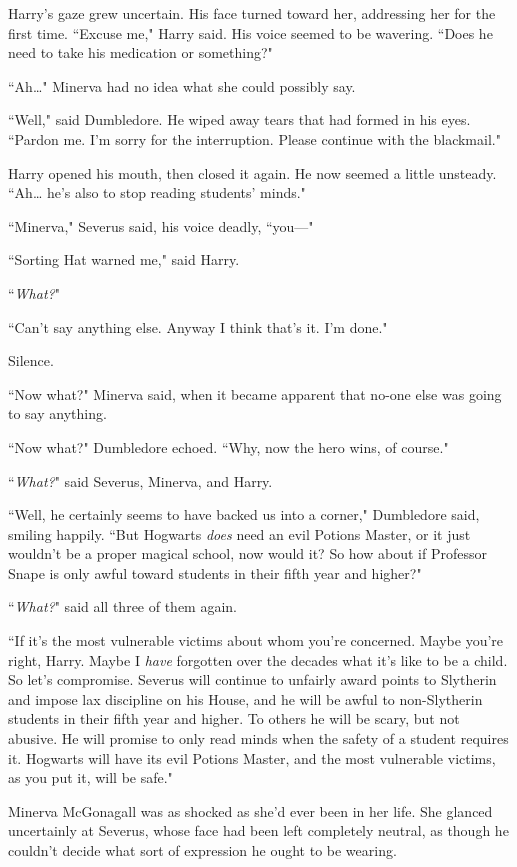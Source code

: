 Harry's gaze grew uncertain. His face turned toward her, addressing her for the first time. ``Excuse me," Harry said. His voice seemed to be wavering. ``Does he need to take his medication or something?"

``Ah{\ldots}" Minerva had no idea what she could possibly say.

``Well," said Dumbledore. He wiped away tears that had formed in his eyes. ``Pardon me. I'm sorry for the interruption. Please continue with the blackmail."

Harry opened his mouth, then closed it again. He now seemed a little unsteady. ``Ah{\ldots} he's also to stop reading students' minds."

``Minerva," Severus said, his voice deadly, ``you—"

``Sorting Hat warned me," said Harry.

``\emph{What?}"

``Can't say anything else. Anyway I think that's it. I'm done."

Silence.

``Now what?" Minerva said, when it became apparent that no-one else was going to say anything.

``Now what?" Dumbledore echoed. ``Why, now the hero wins, of course."

``\emph{What?}" said Severus, Minerva, and Harry.

``Well, he certainly seems to have backed us into a corner," Dumbledore said, smiling happily. ``But Hogwarts \emph{does} need an evil Potions Master, or it just wouldn't be a proper magical school, now would it? So how about if Professor Snape is only awful toward students in their fifth year and higher?"

``\emph{What?}" said all three of them again.

``If it's the most vulnerable victims about whom you're concerned. Maybe you're right, Harry. Maybe I \emph{have} forgotten over the decades what it's like to be a child. So let's compromise. Severus will continue to unfairly award points to Slytherin and impose lax discipline on his House, and he will be awful to non-Slytherin students in their fifth year and higher. To others he will be scary, but not abusive. He will promise to only read minds when the safety of a student requires it. Hogwarts will have its evil Potions Master, and the most vulnerable victims, as you put it, will be safe."

Minerva McGonagall was as shocked as she'd ever been in her life. She glanced uncertainly at Severus, whose face had been left completely neutral, as though he couldn't decide what sort of expression he ought to be wearing.

